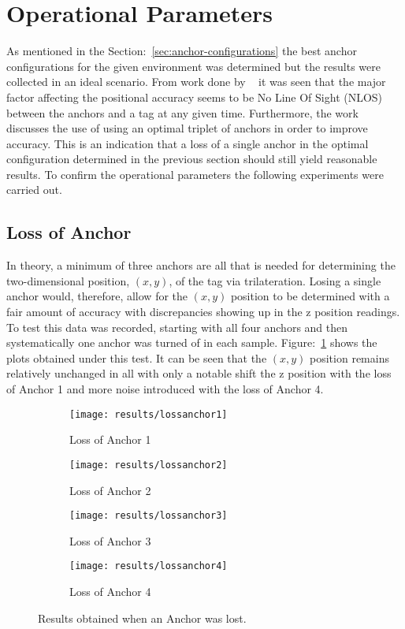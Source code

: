 \section{Operational Parameters}\label{sec:op-params}
As mentioned in the Section:~\ref{sec:anchor-configurations} the best anchor configurations for the given environment was determined  but the results were collected in an ideal scenario.
From work done by ~\citet{evaluwb} it was seen that the major factor affecting the positional accuracy seems to be No Line Of Sight (NLOS) between the anchors and a tag at any given time.
Furthermore, the work discusses the use of using an optimal triplet of anchors in order to improve accuracy.
This is an indication that a loss of a single anchor in the optimal configuration determined in the previous section should still yield reasonable results.
To confirm the operational parameters the following experiments were carried out.

\subsection{Loss of Anchor}\label{subsec:loss-of-anchor}
In theory, a minimum of three anchors are all that is needed for determining the two-dimensional position, $(x,y)$, of the tag via trilateration.
Losing a single anchor would, therefore, allow for the $(x,y)$ position to be determined with a fair amount of accuracy with discrepancies showing up in the z position readings.
To test this data was recorded, starting with all four anchors and then systematically one anchor was turned of in each sample.
Figure:~\ref{fig:Loss_anchors} shows the plots obtained under this test.
It can be seen that the $(x,y)$ position remains relatively unchanged in all with only a notable shift the z position with the loss of Anchor 1 and more noise introduced with the loss of Anchor 4.

\begin{figure}[h!]
    \centering
    \begin{subfigure}{0.45\textwidth}
            \texttt{[image: results/lossanchor1]}
            \caption{Loss of Anchor 1}
    \end{subfigure}
    \begin{subfigure}{0.45\textwidth}
            \texttt{[image: results/lossanchor2]}
            \caption{Loss of Anchor 2}
    \end{subfigure}

    \begin{subfigure}{0.45\textwidth}
            \texttt{[image: results/lossanchor3]}
            \caption{Loss of Anchor 3}
    \end{subfigure}
    \begin{subfigure}{0.45\textwidth}
            \texttt{[image: results/lossanchor4]}
            \caption{Loss of Anchor 4}
    \end{subfigure}
    \caption{Results obtained when an Anchor was lost.}
    \label{fig:Loss_anchors}
\end{figure}
\newpage

